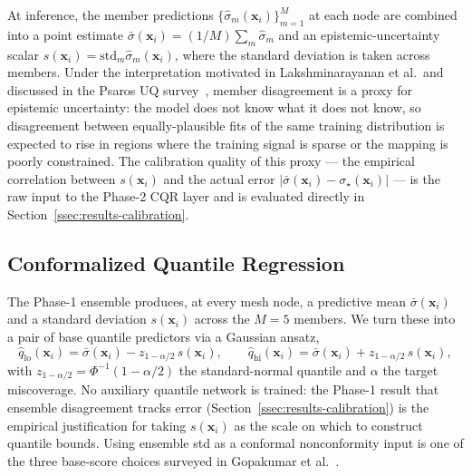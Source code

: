 \documentclass[11pt]{article}
\begin{document}
At inference, the member predictions
$\{\hat{\sigma}_m(\mathbf{x}_i)\}_{m=1}^M$ at each node are combined into a
point estimate $\bar{\sigma}(\mathbf{x}_i) = (1/M) \sum_m \hat{\sigma}_m$
and an epistemic-uncertainty scalar
$s(\mathbf{x}_i) = \mathrm{std}_m \hat{\sigma}_m(\mathbf{x}_i)$, where the
standard deviation is taken across members. Under the interpretation
motivated in Lakshminarayanan et al.\ and discussed in the Psaros UQ
survey~\cite{psaros2023uq}, member disagreement is a proxy for epistemic
uncertainty: the model does not know what it does not know, so disagreement
between equally-plausible fits of the same training distribution is
expected to rise in regions where the training signal is sparse or the
mapping is poorly constrained. The calibration quality of this proxy --- the
empirical correlation between $s(\mathbf{x}_i)$ and the actual error
$\lvert \bar{\sigma}(\mathbf{x}_i) - \sigma_\star(\mathbf{x}_i)\rvert$ ---
is the raw input to the Phase-2 CQR layer and is evaluated directly in
Section~\ref{ssec:results-calibration}.

\subsection{Conformalized Quantile Regression}
\label{ssec:cqr}

The Phase-1 ensemble produces, at every mesh node, a predictive mean
$\bar{\sigma}(\mathbf{x}_i)$ and a standard deviation
$s(\mathbf{x}_i)$ across the $M = 5$ members. We turn these into a pair of
base quantile predictors via a Gaussian ansatz,
\begin{equation}
  \hat{q}_{\text{lo}}(\mathbf{x}_i) = \bar{\sigma}(\mathbf{x}_i)
    - z_{1-\alpha/2}\,s(\mathbf{x}_i),
  \qquad
  \hat{q}_{\text{hi}}(\mathbf{x}_i) = \bar{\sigma}(\mathbf{x}_i)
    + z_{1-\alpha/2}\,s(\mathbf{x}_i),
\end{equation}
with $z_{1-\alpha/2} = \Phi^{-1}(1-\alpha/2)$ the standard-normal quantile
and $\alpha$ the target miscoverage. No auxiliary quantile network is
trained: the Phase-1 result that ensemble disagreement tracks error
(Section~\ref{ssec:results-calibration}) is the empirical justification for
taking $s(\mathbf{x}_i)$ as the scale on which to construct quantile
bounds. Using ensemble std as a conformal nonconformity input is one of the
three base-score choices surveyed in Gopakumar et
al.~\cite{gopakumar2024conformal}.
\end{document}
